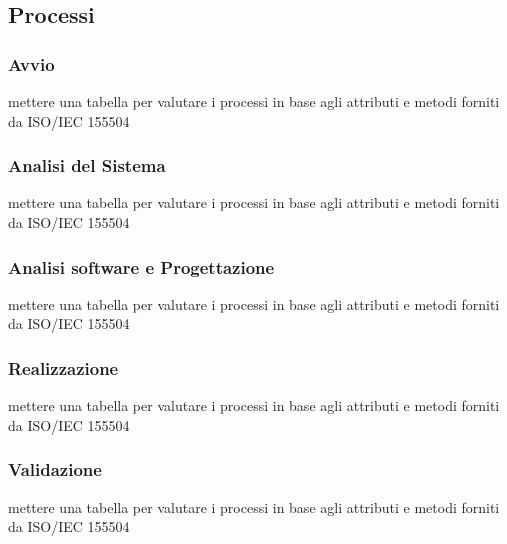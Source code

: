 \subsection{Processi}
\subsubsection{Avvio}
mettere una tabella per valutare i processi in base agli attributi e metodi forniti da ISO/IEC 155504
\subsubsection{Analisi del Sistema}
mettere una tabella per valutare i processi in base agli attributi e metodi forniti da ISO/IEC 155504
\subsubsection{Analisi software e Progettazione}
mettere una tabella per valutare i processi in base agli attributi e metodi forniti da ISO/IEC 155504
\subsubsection{Realizzazione}
mettere una tabella per valutare i processi in base agli attributi e metodi forniti da ISO/IEC 155504
\subsubsection{Validazione}
mettere una tabella per valutare i processi in base agli attributi e metodi forniti da ISO/IEC 155504

